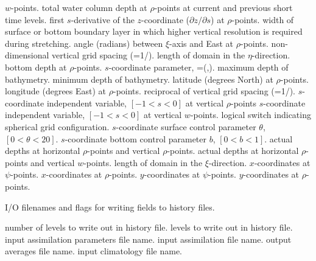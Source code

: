 \begin{klist}
\begin{klist}
    $w$-points.
             total water column depth at $\rho$-points at
    current and previous short time levels.
            first $s$-derivative of the $z$-coordinate
    ($\partial z/\partial s$) at $\rho$-points.
        width of surface or bottom boundary layer in
    which higher vertical resolution is required during
       stretching.
        angle (radians) between $\xi$-axis and East at
    $\rho$-points.
            non-dimensional vertical grid spacing
    (=1/).
            length of domain in the $\eta$-direction.
             bottom depth at $\rho$-points.
            $s$-coordinate parameter,
    =(,).
          maximum depth of bathymetry.
          minimum depth of bathymetry.
          latitude (degrees North) at $\rho$-points.
          longitude (degrees East) at $\rho$-points.
           reciprocal of vertical grid spacing
    (=1/).
          $s$-coordinate independent variable,
    $[-1 < s < 0]$ at vertical $\rho$-points
          $s$-coordinate independent variable,
    $[-1 < s < 0]$ at vertical $w$-points.
          logical switch indicating spherical grid
    configuration.
        $s$-coordinate surface control parameter
    $\theta$, $[0 < \theta < 20]$.
        $s$-coordinate bottom control parameter $b$,
    $[0 < b < 1]$.
          actual depths at horizontal $\rho$-points and
    vertical $\rho$-points.
          actual depths at horizontal $\rho$-points and
    vertical $w$-points.
            length of domain in the $\xi$-direction.
            $x$-coordinates at $\psi$-points.
            $x$-coordinates at $\rho$-points.
            $y$-coordinates at $\psi$-points.
            $y$-coordinates at $\rho$-points.
    \end{klist}
   I/O filenames and flags for writing fields to
  history files.
    \begin{klist}
              number of levels to write out in history file.
               levels to write out in history file.
           input assimilation parameters file name.
           input assimilation file name.
           output averages file name.
           input climatology file name.

\end{klist}
\end{klist}
